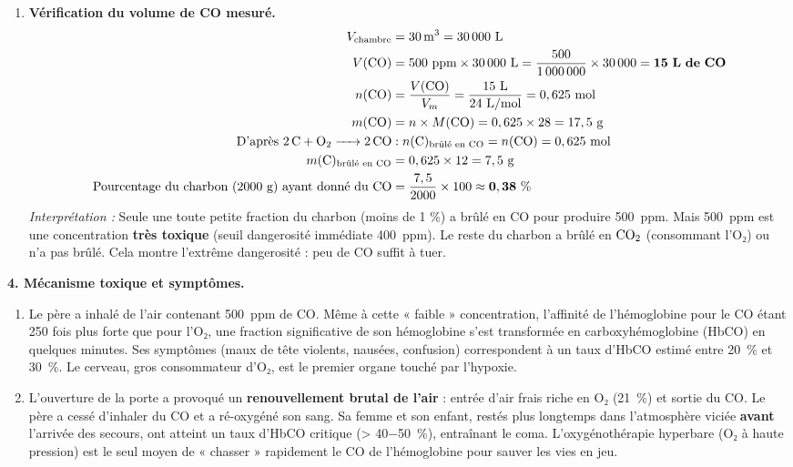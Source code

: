 \documentclass[11pt]{article}
\begin{document}
\begin{exoresolu}
\begin{enumerate}
    \item[d)] \textbf{Vérification du volume de CO mesuré.}
    \begin{align*}
        V_{\text{chambre}} &= \SI{30}{\cubic\meter} = 30\,000\ \text{L} \\
        V(\ce{CO}) &= \num{500}~\text{ppm} \times 30\,000\ \text{L} = \frac{500}{1\,000\,000} \times 30\,000 = \mathbf{15\ L\ de\ CO} \\
        n(\ce{CO}) &= \frac{V(\ce{CO})}{V_m} = \frac{15\ \text{L}}{24\ \text{L/mol}} = 0,625\ \text{mol} \\
        m(\ce{CO}) &= n \times M(\ce{CO}) = 0,625 \times 28 = 17,5\ \text{g} \\
        \text{D'après } \ce{2C + O2 -> 2CO} &: n(\ce{C})_{\text{brûlé en CO}} = n(\ce{CO}) = 0,625\ \text{mol} \\
        m(\ce{C})_{\text{brûlé en CO}} &= 0,625 \times 12 = 7,5\ \text{g} \\
        \text{Pourcentage du charbon (2000 g) ayant donné du CO} &= \frac{7,5}{2000} \times 100 \approx \mathbf{0,38\ \%}
    \end{align*}
    \emph{Interprétation :} Seule une toute petite fraction du charbon (moins de 1 \%) a brûlé en CO pour produire \num{500}~ppm. Mais \num{500}~ppm est une concentration \textbf{très toxique} (seuil dangerosité immédiate \num{400}~ppm). Le reste du charbon a brûlé en $\ce{CO2}$ (consommant l'O₂) ou n'a pas brûlé. Cela montre l'extrême dangerosité : peu de CO suffit à tuer.
\end{enumerate}

\textbf{4. Mécanisme toxique et symptômes.}
\begin{enumerate}
    \item[a)] Le père a inhalé de l'air contenant \num{500}~ppm de CO. Même à cette « faible » concentration, l'affinité de l'hémoglobine pour le CO étant 250 fois plus forte que pour l'O₂, une fraction significative de son hémoglobine s'est transformée en carboxyhémoglobine (HbCO) en quelques minutes. Ses symptômes (maux de tête violents, nausées, confusion) correspondent à un taux d'HbCO estimé entre \SI{20}{\percent} et \SI{30}{\percent}. Le cerveau, gros consommateur d'O₂, est le premier organe touché par l'hypoxie.
    \item[b)] L'ouverture de la porte a provoqué un \textbf{renouvellement brutal de l'air} : entrée d'air frais riche en O₂ (\SI{21}{\percent}) et sortie du CO. Le père a cessé d'inhaler du CO et a ré-oxygéné son sang. Sa femme et son enfant, restés plus longtemps dans l'atmosphère viciée \textbf{avant} l'arrivée des secours, ont atteint un taux d'HbCO critique (> \SI{40-50}{\percent}), entraînant le coma. L'oxygénothérapie hyperbare (O₂ à haute pression) est le seul moyen de « chasser » rapidement le CO de l'hémoglobine pour sauver les vies en jeu.
\end{enumerate}


\end{exoresolu}
\end{document}
